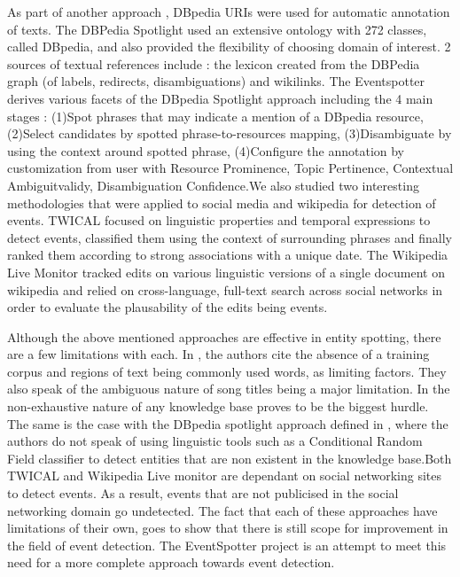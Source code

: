 \documentclass[a4paper,11pt]{report}
\begin{document}
As part of another approach , DBpedia URIs were used for automatic annotation of texts. The DBPedia Spotlight \cite{Mendes11dbpediaspotlight:} used an extensive ontology with 272 classes, called DBpedia, and also provided the flexibility of choosing domain of interest. 2 sources of textual references include : the lexicon created from the DBPedia graph (of labels, redirects, disambiguations) and wikilinks. The Eventspotter derives various facets of the DBpedia Spotlight approach including the 4 main stages : (1)Spot phrases that may indicate a mention of a DBpedia resource, (2)Select candidates by spotted phrase-to-resources mapping, (3)Disambiguate by using the context around spotted phrase, (4)Configure the annotation by customization from user with Resource Prominence, Topic Pertinence, Contextual Ambiguitvalidy, Disambiguation Confidence.We also studied two interesting methodologies that were applied to social media and wikipedia for detection of events. TWICAL \cite{Ritter_opendomain} focused on linguistic properties and temporal expressions to detect events, classified them using the context of surrounding phrases and finally ranked them according to strong associations with a unique date. The Wikipedia Live Monitor\cite{DBLP:journals/corr/abs-1303-4702} tracked edits on various linguistic versions of a single document on wikipedia and relied on cross-language, full-text search across social networks in order to evaluate the \cite{Hassell06ontology-drivenautomatic} plausability of the edits being events. \newline

Although the above mentioned approaches are effective in entity spotting, there are a few limitations with each. In \cite{Gruhl_contextand}, the authors cite the absence of a training corpus and regions of text being commonly used words, as limiting factors. They also speak of the ambiguous nature of song titles being a major limitation. In \cite{Hassell06ontology-drivenautomatic} the non-exhaustive nature of any knowledge base proves to be the biggest hurdle. The same is the case with the DBpedia spotlight approach defined in \cite{Mendes11dbpediaspotlight:}, where the authors do not speak of using linguistic tools such as a Conditional Random Field classifier to detect entities that are non existent in the knowledge base.Both TWICAL \cite{Ritter_opendomain} and Wikipedia Live monitor \cite{DBLP:journals/corr/abs-1303-4702} are dependant on social networking sites to detect events. As a result, events that are not publicised in the social networking domain go undetected. The fact that each of these approaches have limitations of their own, goes to show that there is still scope for improvement in the field of event detection. The EventSpotter project is an attempt to meet this need for a more complete approach towards event detection.
\end{document}
